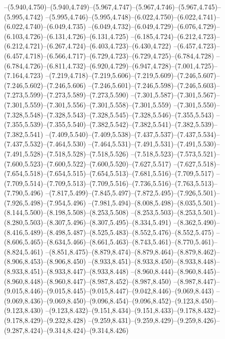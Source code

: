   --(5.940,4.750)--(5.940,4.749)--(5.967,4.747)--(5.967,4.746)--(5.967,4.745)--(5.995,4.742)%
  --(5.995,4.746)--(5.995,4.748)--(6.022,4.750)--(6.022,4.741)--(6.022,4.740)--(6.049,4.735)%
  --(6.049,4.732)--(6.049,4.729)--(6.076,4.729)--(6.103,4.726)--(6.131,4.726)--(6.131,4.725)%
  --(6.185,4.724)--(6.212,4.723)--(6.212,4.721)--(6.267,4.724)--(6.403,4.723)--(6.430,4.722)%
  --(6.457,4.723)--(6.457,4.718)--(6.566,4.717)--(6.729,4.723)--(6.729,4.725)--(6.784,4.728)%
  --(6.784,4.726)--(6.811,4.732)--(6.920,4.729)--(6.947,4.728)--(7.001,4.725)--(7.164,4.723)%
  --(7.219,4.718)--(7.219,5.606)--(7.219,5.609)--(7.246,5.607)--(7.246,5.602)--(7.246,5.606)%
  --(7.246,5.601)--(7.246,5.598)--(7.246,5.603)--(7.273,5.599)--(7.273,5.589)--(7.273,5.590)%
  --(7.301,5.587)--(7.301,5.567)--(7.301,5.559)--(7.301,5.556)--(7.301,5.558)--(7.301,5.559)%
  --(7.301,5.550)--(7.328,5.548)--(7.328,5.543)--(7.328,5.545)--(7.328,5.546)--(7.355,5.543)%
  --(7.355,5.539)--(7.355,5.540)--(7.382,5.542)--(7.382,5.541)--(7.382,5.539)--(7.382,5.541)%
  --(7.409,5.540)--(7.409,5.538)--(7.437,5.537)--(7.437,5.534)--(7.437,5.532)--(7.464,5.530)%
  --(7.464,5.531)--(7.491,5.531)--(7.491,5.530)--(7.491,5.528)--(7.518,5.528)--(7.518,5.526)%
  --(7.518,5.523)--(7.573,5.521)--(7.600,5.523)--(7.600,5.522)--(7.600,5.520)--(7.627,5.517)%
  --(7.627,5.518)--(7.654,5.518)--(7.654,5.515)--(7.654,5.513)--(7.681,5.516)--(7.709,5.517)%
  --(7.709,5.514)--(7.709,5.513)--(7.709,5.516)--(7.736,5.516)--(7.763,5.513)--(7.790,5.496)%
  --(7.817,5.499)--(7.845,5.497)--(7.872,5.495)--(7.926,5.501)--(7.926,5.498)--(7.954,5.496)%
  --(7.981,5.494)--(8.008,5.498)--(8.035,5.501)--(8.144,5.500)--(8.198,5.508)--(8.253,5.508)%
  --(8.253,5.503)--(8.253,5.501)--(8.280,5.503)--(8.307,5.496)--(8.307,5.495)--(8.334,5.491)%
  --(8.362,5.490)--(8.416,5.489)--(8.498,5.487)--(8.525,5.483)--(8.552,5.476)--(8.552,5.475)%
  --(8.606,5.465)--(8.634,5.466)--(8.661,5.463)--(8.743,5.461)--(8.770,5.461)--(8.824,5.461)%
  --(8.851,8.475)--(8.879,8.474)--(8.879,8.464)--(8.879,8.462)--(8.906,8.453)--(8.906,8.450)%
  --(8.933,8.451)--(8.933,8.450)--(8.933,8.448)--(8.933,8.451)--(8.933,8.447)--(8.933,8.448)%
  --(8.960,8.444)--(8.960,8.445)--(8.960,8.448)--(8.960,8.447)--(8.987,8.452)--(8.987,8.450)%
  --(8.987,8.447)--(9.015,8.446)--(9.015,8.445)--(9.015,8.447)--(9.042,8.446)--(9.069,8.443)%
  --(9.069,8.436)--(9.069,8.450)--(9.096,8.454)--(9.096,8.452)--(9.123,8.450)--(9.123,8.430)%
  --(9.123,8.432)--(9.151,8.434)--(9.151,8.433)--(9.178,8.432)--(9.178,8.429)--(9.232,8.428)%
  --(9.259,8.431)--(9.259,8.429)--(9.259,8.426)--(9.287,8.424)--(9.314,8.424)--(9.314,8.426)%
